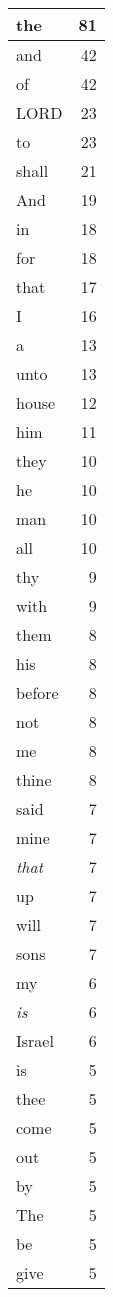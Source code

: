\begin{center}
\begin{longtable}{l|r}
\hline \hline
\endlastfoot
the & 81 \\ \hline
and & 42 \\ \hline
of & 42 \\ \hline
LORD & 23 \\ \hline
to & 23 \\ \hline
shall & 21 \\ \hline
And & 19 \\ \hline
in & 18 \\ \hline
for & 18 \\ \hline
that & 17 \\ \hline
I & 16 \\ \hline
a & 13 \\ \hline
unto & 13 \\ \hline
house & 12 \\ \hline
him & 11 \\ \hline
they & 10 \\ \hline
he & 10 \\ \hline
man & 10 \\ \hline
all & 10 \\ \hline
thy & 9 \\ \hline
with & 9 \\ \hline
them & 8 \\ \hline
his & 8 \\ \hline
before & 8 \\ \hline
not & 8 \\ \hline
me & 8 \\ \hline
thine & 8 \\ \hline
said & 7 \\ \hline
mine & 7 \\ \hline
\emph{that} & 7 \\ \hline
up & 7 \\ \hline
will & 7 \\ \hline
sons & 7 \\ \hline
my & 6 \\ \hline
\emph{is} & 6 \\ \hline
Israel & 6 \\ \hline
is & 5 \\ \hline
thee & 5 \\ \hline
come & 5 \\ \hline
out & 5 \\ \hline
by & 5 \\ \hline
The & 5 \\ \hline
be & 5 \\ \hline
give & 5 \\ \hline

\end{longtable}
\end{center}
